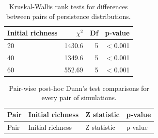 \begin{longtable}[]{@{}lrrr@{}}
\caption[Kruskal-Wallis tests for persistence distributions]{\color{Gray}Kruskal-Wallis rank tests for differences between pairs of persistence distributions.}\label{tab:tableApp3.2.1}\\
\toprule
Initial richness & \(\chi^2\) & Df & p-value\tabularnewline
\midrule
\endhead
20 & 1430.6 & 5 & \textless{} 0.001\tabularnewline
40 & 1349.6 & 5 & \textless{} 0.001\tabularnewline
60 & 552.69 & 5 & \textless{} 0.001\tabularnewline
\bottomrule
\end{longtable}

\begin{longtable}[]{@{}llll@{}}
\caption[Post-hoc Dunn tests for persistence distributions]{\color{Gray}Pair-wise post-hoc Dunn's test comparisons for every pair of simulations.}\label{tab:tableApp3.2.2}\\
\toprule
Pair & Initial richness & Z statistic & p-value\tabularnewline
\midrule
\endfirsthead
\toprule
Pair & Initial richness & Z statistic & p-value\tabularnewline
\midrule
\endhead


\end{longtable}
